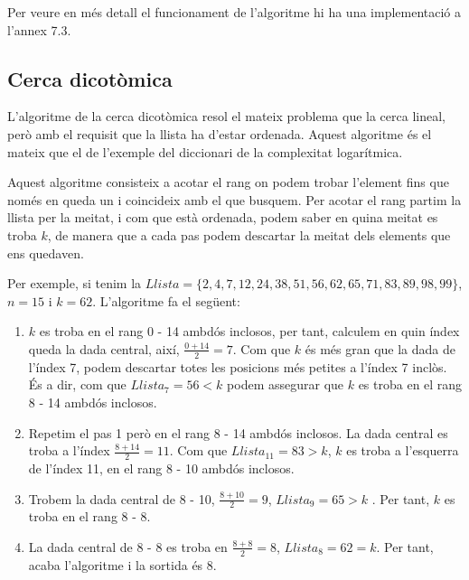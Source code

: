 Per veure en més detall el funcionament de l'algoritme hi ha una implementació a l'annex 7.3.

\subsection{Cerca dicotòmica}
L'algoritme de la cerca dicotòmica resol el mateix problema que la cerca lineal, però amb el requisit que la llista ha d'estar ordenada. Aquest algoritme és el mateix que el de l'exemple del diccionari de la complexitat logarítmica. 

Aquest algoritme consisteix a acotar el rang on podem trobar l'element fins que només en queda un i coincideix amb el que busquem. Per acotar el rang partim la llista per la meitat, i com que està ordenada, podem saber en quina meitat es troba $k$, de manera que a cada pas podem descartar la meitat dels elements que ens quedaven.

\newpage
Per exemple, si tenim la $Llista = \lbrace 2, 4, 7, 12, 24, 38, 51, 56, 62, 65, 71, 83, 89, 98, 99 \rbrace$, $n = 15$ i $k = 62$. L'algoritme fa el següent:

\begin{enumerate}
\item $k$ es troba en el rang 0 - 14 ambdós inclosos, per tant,  calculem en quin índex queda la dada central, així, $\frac{0+14}{2} = 7$. Com que $k$ és més gran que la dada de l'índex 7, podem descartar totes les posicions més petites a l'índex 7 inclòs. És a dir, com que $Llista_7 = 56 < k$  podem assegurar que $k$ es troba en el rang 8 - 14 ambdós inclosos.
\item Repetim el pas 1 però en el rang 8 - 14 ambdós inclosos. La dada central es troba a l'índex $\frac{8+14}{2} = 11$. Com que $Llista_{11} = 83 > k$, $k$ es troba a l'esquerra de l'índex 11, en el rang 8 - 10 ambdós inclosos. 
\item Trobem la dada central de 8 - 10, $\frac{8+10}{2} = 9$, $Llista_9 = 65 > k$ . Per tant, $k$ es troba en el rang 8 - 8.
\item La dada central de 8 - 8 es troba en $\frac{8+8}{2} = 8$, $Llista_8 = 62 = k$. Per tant, acaba l'algoritme i la sortida és 8. 
\end{enumerate}

